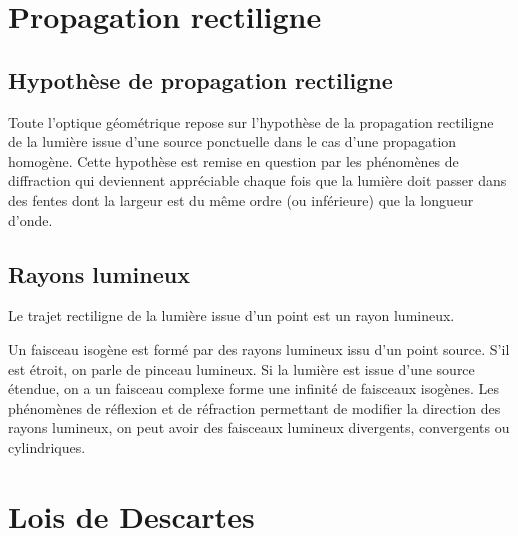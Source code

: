 \section{Propagation rectiligne}%
\label{chap6-sec:propagationrectiligne}%
%
\subsection{Hypothèse de propagation rectiligne}%
\label{chap6-subsec:hypothesedepropagationrectiligne}%
%
Toute l'optique géométrique repose sur l'hypothèse de la propagation rectiligne 
de la lumière issue d'une source ponctuelle dans le cas d'une propagation 
homogène. Cette hypothèse est remise en question par les phénomènes de 
diffraction qui deviennent appréciable chaque fois que la lumière doit passer 
dans des fentes dont la largeur est du même ordre (ou inférieure) que la 
longueur d'onde.
%
\subsection{Rayons lumineux}\label{chap6-subsec:rayonslumineux}%
%
\begin{defdef}%
 Le trajet rectiligne de la lumière issue d'un point est un rayon lumineux.
\end{defdef}%
%
Un faisceau isogène est formé par des rayons lumineux issu d'un point source. 
S'il est étroit, on parle de pinceau lumineux. Si la lumière est issue d'une 
source étendue, on a un faisceau complexe forme une infinité de faisceaux 
isogènes. Les phénomènes de réflexion et de réfraction permettant de modifier 
la direction des rayons lumineux, on peut avoir des faisceaux lumineux 
divergents, convergents ou cylindriques.
%
\section{Lois de Descartes}\label{chap6-sec:LoisdeSnellDescartes}%
%
